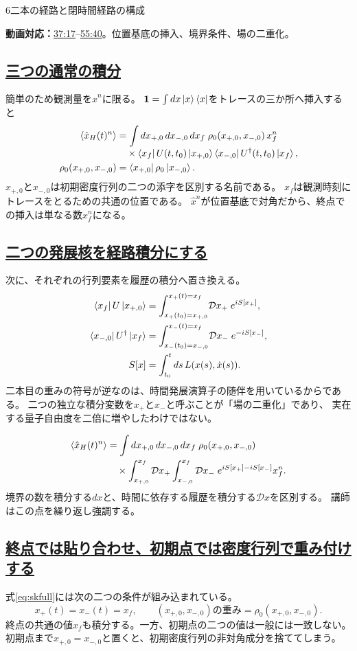 \documentclass[a4paper,11pt]{ltjsarticle}
\newcommand{\subsectionlink}[1]{\subsection[#1]{\hyperlink{toc}{#1}}}
\numberwithin{equation}{section}
\newcommand{\id}{\mathbf{1}}
\newcommand{\av}[1]{\langle #1\rangle}
\newcommand{\video}[2]{\href{https://www.youtube.com/watch?v=RYxzcUhIHjk\&t=#1s}{#2}}
\newcommand{\videosource}[1]{\par\noindent\textcolor{noteblue}{\textbf{動画対応：}#1}\par\smallskip}
\begin{document}
\begin{lecturesection}{6}{二本の経路と閉時間経路の構成}
\label{sec:contour}
\videosource{\video{2237}{37:17}--\video{3340}{55:40}。位置基底の挿入、境界条件、場の二重化。}
\subsectionlink{三つの通常の積分}
簡単のため観測量を$\hat x^n$に限る。
$\id=\int dx\ket x\bra x$をトレースの三か所へ挿入すると
\begin{align}
 \av{\hat x_H(t)^n}
  &=\int dx_{+,0}\,dx_{-,0}\,dx_f\;
     \rho_0(x_{+,0},x_{-,0})\,x_f^n\notag\\[-0.3em]
  &\quad\times
     \bra{x_f}U(t,t_0)\ket{x_{+,0}}
     \bra{x_{-,0}}U^\dagger(t,t_0)\ket{x_f},
 \label{eq:threeintegrals}\\
 \rho_0(x_{+,0},x_{-,0})&=\bra{x_{+,0}}\rho_0\ket{x_{-,0}}.
\end{align}
$x_{+,0}$と$x_{-,0}$は初期密度行列の二つの添字を区別する名前である。
$x_f$は観測時刻にトレースをとるための共通の位置である。
$\hat x^n$が位置基底で対角だから、終点での挿入は単なる数$x_f^n$になる。

\subsectionlink{二つの発展核を経路積分にする}
次に、それぞれの行列要素を履歴の積分へ置き換える。
\begin{align}
 \bra{x_f}U\ket{x_{+,0}}
   &=\int_{x_+(t_0)=x_{+,0}}^{x_+(t)=x_f}\!\mathcal D x_+\;e^{iS[x_+]},\\
 \bra{x_{-,0}}U^\dagger\ket{x_f}
   &=\int_{x_-(t_0)=x_{-,0}}^{x_-(t)=x_f}\!\mathcal D x_-\;e^{-iS[x_-]},\\
 S[x]&=\int_{t_0}^t ds\,L(x(s),\dot x(s)).
\end{align}
二本目の重みの符号が逆なのは、時間発展演算子の随伴を用いているからである。
二つの独立な積分変数を$x_+$と$x_-$と呼ぶことが「場の二重化」であり、
実在する量子自由度を二倍に増やしたわけではない。

\begin{align}
 \av{\hat x_H(t)^n}
  &=\int dx_{+,0}\,dx_{-,0}\,dx_f\;\rho_0(x_{+,0},x_{-,0})\notag\\
  &\quad\times\int_{x_{+,0}}^{x_f}\mathcal D x_+
       \int_{x_{-,0}}^{x_f}\mathcal D x_-\;
       e^{iS[x_+]-iS[x_-]}x_f^n.
 \label{eq:skfull}
\end{align}
境界の数を積分する$dx$と、時間に依存する履歴を積分する$\mathcal D x$を区別する。
講師はこの点を繰り返し強調する。

\subsectionlink{終点では貼り合わせ、初期点では密度行列で重み付けする}
式\eqref{eq:skfull}には次の二つの条件が組み込まれている。
\begin{equation}
 x_+(t)=x_-(t)=x_f,\qquad
 (x_{+,0},x_{-,0})\text{の重み}=\rho_0(x_{+,0},x_{-,0}).
\end{equation}
終点の共通の値$x_f$も積分する。一方、初期点の二つの値は一般には一致しない。
初期点まで$x_{+,0}=x_{-,0}$と置くと、初期密度行列の非対角成分を捨ててしまう。


\end{lecturesection}
\end{document}
